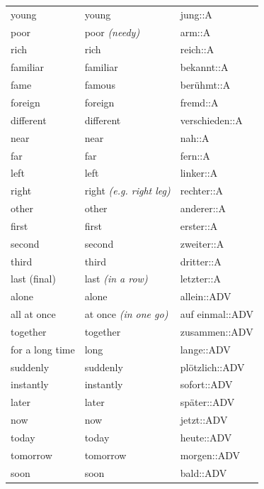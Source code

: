 \begin{center}
\begin{longtable}{lll}
{\sc \lowercase{	YOUNG	}}	&	young		&	jung::A	\\
{\sc \lowercase{	POOR	}}	&	poor	\textit{\footnotesize (needy)}	&	arm::A	\\
{\sc \lowercase{	RICH	}}	&	rich		&	reich::A	\\
{\sc \lowercase{	FAMILIAR	}}	&	familiar		&	bekannt::A	\\
{\sc \lowercase{	FAME	}}	&	famous		&	berühmt::A	\\
{\sc \lowercase{	FOREIGN	}}	&	foreign		&	fremd::A	\\
{\sc \lowercase{	DIFFERENT	}}	&	different		&	verschieden::A	\\
{\sc \lowercase{	NEAR	}}	&	near		&	nah::A	\\
{\sc \lowercase{	FAR	}}	&	far		&	fern::A	\\
{\sc \lowercase{	LEFT	}}	&	left		&	linker::A	\\
{\sc \lowercase{	RIGHT	}}	&	right	\textit{\footnotesize (e.g. right leg)}	&	rechter::A	\\
{\sc \lowercase{	OTHER	}}	&	other		&	anderer::A	\\
{\sc \lowercase{	FIRST	}}	&	first		&	erster::A	\\
{\sc \lowercase{	SECOND	}}	&	second		&	zweiter::A	\\
{\sc \lowercase{	THIRD	}}	&	third		&	dritter::A	\\
{\sc \lowercase{	LAST \footnotesize (FINAL)	}}	&	last	\textit{\footnotesize (in a row)}	&	letzter::A	\\
{\sc \lowercase{	ALONE	}}	&	alone		&	allein::ADV	\\
{\sc \lowercase{	ALL AT ONCE	}}	&	at once	\textit{\footnotesize (in one go)}	&	auf einmal::ADV	\\
{\sc \lowercase{	TOGETHER	}}	&	together		&	zusammen::ADV	\\
{\sc \lowercase{	FOR A LONG TIME	}}	&	long		&	lange::ADV	\\
{\sc \lowercase{	SUDDENLY	}}	&	suddenly		&	plötzlich::ADV	\\
{\sc \lowercase{	INSTANTLY	}}	&	instantly		&	sofort::ADV	\\
{\sc \lowercase{	LATER	}}	&	later		&	später::ADV	\\
{\sc \lowercase{	NOW	}}	&	now		&	jetzt::ADV	\\
{\sc \lowercase{	TODAY	}}	&	today		&	heute::ADV	\\
{\sc \lowercase{	TOMORROW	}}	&	tomorrow		&	morgen::ADV	\\
{\sc \lowercase{	SOON	}}	&	soon		&	bald::ADV	\\

\end{longtable}
\end{center}
